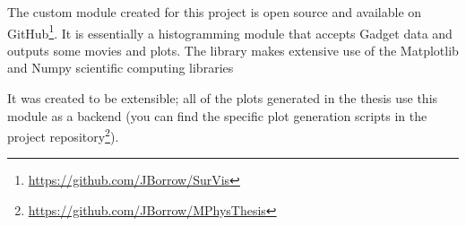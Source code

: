 The custom \sv module created for this project is open source and available on GitHub\footnote{\url{https://github.com/JBorrow/SurVis}}.
It is essentially a histogramming module that accepts Gadget data and outputs some movies and plots.
The \sv library makes extensive use of the Matplotlib and Numpy scientific computing libraries \citep{hunter_matplotlib:_2007, walt_numpy_2011}

It was created to be extensible; all of the plots generated in the thesis use this module as a backend (you can find the specific plot generation scripts in the project repository\footnote{\url{https://github.com/JBorrow/MPhysThesis}}).
